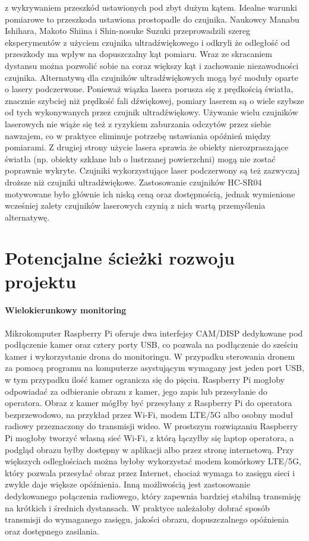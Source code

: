 \documentclass[a4paper,12pt]{book}
\begin{document}
        z wykrywaniem przeszkód ustawionych pod zbyt dużym kątem. Idealne warunki pomiarowe to przeszkoda ustawiona prostopadle do czujnika. 
        Naukowcy Manabu Ishihara, Makoto Shiina i Shin-nosuke Suzuki przeprowadzili szereg eksperymentów z użyciem czujnika \mbox{ultradźwiękowego\cite{Ishihara2009UltrasonicWalls}} i odkryli że odległość od przeszkody ma 
        wpływ na dopuszczalny kąt pomiaru. Wraz ze skracaniem dystansu można pozwolić sobie na coraz większy kąt i zachowanie niezawodności czujnika. Alternatywą dla czujników ultradźwiękowych mogą być moduły oparte o 
        lasery podczerwone. Ponieważ wiązka lasera porusza się z prędkością światła, znacznie szybciej niż prędkość fali dźwiękowej, pomiary laserem są o wiele szybsze od tych wykonywanych przez czujnik ultradźwiękowy. 
        Używanie wielu czujników laserowych nie wiąże się też z ryzykiem zaburzania odczytów przez siebie nawzajem, co w praktyce eliminuje potrzebę ustawiania opóźnień między pomiarami. Z drugiej strony użycie lasera sprawia że 
        obiekty nierozpraszające światła (np. obiekty szklane lub o lustrzanej powierzchni) mogą nie zostać poprawnie wykryte. Czujniki wykorzystujące laser podczerwony są też zazwyczaj droższe niż czujniki ultradźwiękowe. Zastosowanie czujników HC-SR04 motywowane było głównie ich niską 
        ceną oraz dostępnością, jednak wymienione wcześniej zalety czujników laserowych czynią z nich wartą przemyślenia alternatywę.

\chapter{Potencjalne ścieżki rozwoju projektu}
    \subsubsection*{Wielokierunkowy monitoring}
        Mikrokomputer Raspberry Pi oferuje dwa interfejsy CAM/DISP dedykowane pod podłączenie kamer oraz cztery porty USB, co pozwala na podłączenie do sześciu kamer i wykorzystanie drona 
        do monitoringu. W przypadku sterowania dronem za pomocą programu na komputerze asystującym wymagany jest jeden port USB, w tym przypadku ilość kamer ogranicza się do pięciu. 
        Raspberry Pi mogłoby odpowiadać za odbieranie obrazu z kamer, jego zapis lub przesyłanie do operatora. Obraz z kamer mógłby być przesyłany z Raspberry Pi do operatora bezprzewodowo, 
        na przykład przez Wi-Fi, modem LTE/5G albo osobny moduł radiowy przeznaczony do transmisji wideo. W prostszym rozwiązaniu Raspberry Pi mogłoby tworzyć własną sieć Wi-Fi, z którą 
        łączyłby się laptop operatora, a podgląd obrazu byłby dostępny w aplikacji albo przez stronę internetową. Przy większych odległościach można byłoby wykorzystać modem 
        komórkowy LTE/5G, który pozwala przesyłać obraz przez Internet, chociaż wymaga to zasięgu sieci i zwykle daje większe opóźnienia. Inną możliwością jest zastosowanie 
        dedykowanego połączenia radiowego, który zapewnia bardziej stabilną transmisję na krótkich i średnich dystansach. W praktyce należałoby dobrać sposób transmisji do wymaganego 
        zasięgu, jakości obrazu, dopuszczalnego opóźnienia oraz dostępnego zasilania.
\end{document}

